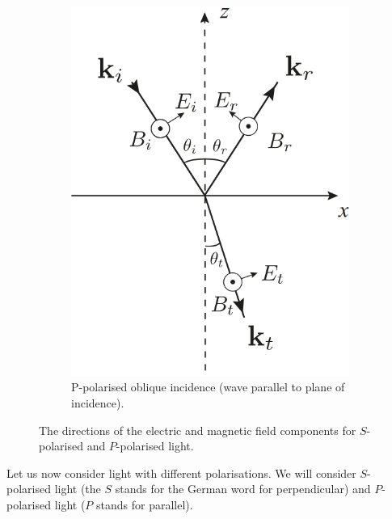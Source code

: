 \documentclass{book}
\begin{document}
\begin{figure}[h]
\begin{subfigure}{0.4\textwidth}
		\includegraphics[width=0.9\linewidth]{p-polar.png}
		\caption{P-polarised oblique incidence (wave parallel to plane of incidence).}
	\end{subfigure}
	\caption{The directions of the electric and magnetic field components for $S$-polarised and $P$-polarised
		light.}
\end{figure}
Let us now consider light with different polarisations. We will consider $S$-polarised light (the $S$ stands for the German word for perpendicular) and $P$-polarised light ($P$ stands for parallel). 
\end{document}
